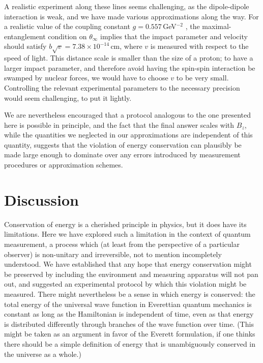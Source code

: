 \documentclass[12pt,aps,prd,onecolumn,nofootinbib,notitlepage]{revtex4-1}
\begin{document}
A realistic experiment along these lines seems challenging, as the dipole-dipole interaction is weak, and we have made various approximations along the way.
For a realistic value of the coupling constant $g= 0.557\,$GeV$^{-2}$ \cite{levitt2015, gamman, gammap}, the maximal-entanglement condition on $\theta_\infty$ implies that the impact parameter and velocity should satisfy $b\sqrt{v} = 7.38\times 10^{-14}\,$cm, where $v$ is measured with respect to the speed of light. 
This distance scale is smaller than the size of a proton; to have a larger impact parameter, and therefore avoid having the spin-spin interaction be swamped by nuclear forces, we would have to choose $v$ to be very small.
Controlling the relevant experimental parameters to the necessary precision would seem challenging, to put it lightly.

We are nevertheless encouraged that a protocol analogous to the one presented here is possible in principle, and the fact that the final answer scales with $B_z$, while the quantities we neglected in our approximations are independent of this quantity, suggests that the violation of energy conservation can plausibly be made large enough to dominate over any errors introduced by measurement procedures or approximation schemes.


\section{Discussion}

Conservation of energy is a cherished principle in physics, but it does have its limitations.
Here we have explored such a limitation in the context of quantum measurement, a process which (at least from the perspective of a particular observer) is non-unitary and irreversible, not to mention incompletely understood.
We have established that any hope that energy conservation might be preserved by including the environment and measuring apparatus will not pan out, and suggested an experimental protocol by which this violation might be measured.
There might nevertheless be a sense in which energy is conserved: the total energy of the universal wave function in Everettian quantum mechanics is constant as long as the Hamiltonian is independent of time, even as that energy is distributed differently through branches of the wave function over time.
(This might be taken as an argument in favor of the Everett formulation, if one thinks there should be a simple definition of energy that is unambiguously conserved in the universe as a whole.)
\end{document}
